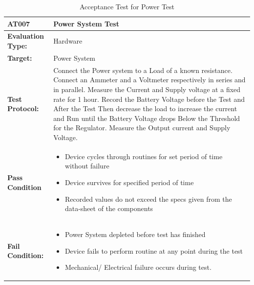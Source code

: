 \begin{table}[H]
	\centering
	\caption{Acceptance Test for Power Test}
	\begin{tabular}{|m{}|m{}|}
		\hline
		\textbf{AT007 }& \textbf{Power System Test} \\
		\hline
		\textbf{Evaluation Type:} & Hardware\\
		\hline
		\textbf{Target: } & Power System \\
		\hline
		\textbf{Test Protocol:} & Connect the Power system to a Load of a known resistance. Connect an Ammeter and a Voltmeter respectively in series and in parallel. Measure the Current and Supply voltage at a fixed rate for 1 hour. Record the Battery Voltage before the Test and After the Test Then decrease the load to increase the current and Run until the Battery Voltage drops Below the Threshold for the Regulator. Measure the Output current and Supply Voltage. \\
		\hline
		\textbf{Pass Condition} & \vspace{5pt} \begin{itemize}
			\item Device cycles through routines for set period of time without failure
			\item Device survives for specified period of time
			\item Recorded values do not exceed the specs given from the data-sheet of the components
		\end{itemize} \\
		\hline
		\textbf{Fail Condition:} & \vspace{5pt} \begin{itemize}
			\item Power System depleted before test has finished
			\item Device fails to perform routine at any point during the test
			\item Mechanical/ Electrical failure occurs during test.
		\end{itemize}\\
		\hline
	\end{tabular}
	\label{tab:AT007}
\end{table}


